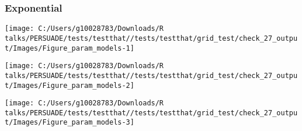 \documentclass[
]{article}
\begin{document}
\clearpage

\begin{table}[H]
\centering
\caption{\label{tab:Table_2}Goodness of fit statistics}
\centering
{}
\end{table}

\clearpage

\clearpage

\subsubsection{Exponential}\label{exponential}

\begin{flushleft}\texttt{[image: C:/Users/g10028783/Downloads/R talks/PERSUADE/tests/testthat//tests/testthat/grid\_test/check\_27\_output/Images/Figure\_param\_models-1]} \end{flushleft}

\begin{flushleft}\texttt{[image: C:/Users/g10028783/Downloads/R talks/PERSUADE/tests/testthat//tests/testthat/grid\_test/check\_27\_output/Images/Figure\_param\_models-2]} \end{flushleft}

\begin{flushleft}\texttt{[image: C:/Users/g10028783/Downloads/R talks/PERSUADE/tests/testthat//tests/testthat/grid\_test/check\_27\_output/Images/Figure\_param\_models-3]} \end{flushleft}
\end{document}
